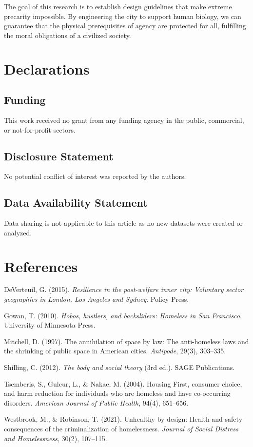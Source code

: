 \documentclass[12pt]{article}
\newenvironment{hangingpars}
  {\setlength{\parindent}{0pt}
   \setlength{\parskip}{6pt}
   \everypar{\hangindent=0.5in}}
  {}
\begin{document}
The goal of this research is to establish design guidelines that make extreme precarity impossible. By engineering the city to support human biology, we can guarantee that the physical prerequisites of agency are protected for all, fulfilling the moral obligations of a civilized society.

\section*{Declarations}

\subsection*{Funding}
This work received no grant from any funding agency in the public, commercial, or not-for-profit sectors.

\subsection*{Disclosure Statement}
No potential conflict of interest was reported by the authors.

\subsection*{Data Availability Statement}
Data sharing is not applicable to this article as no new datasets were created or analyzed.



\section*{References}
\begin{hangingpars}
DeVerteuil, G. (2015). \textit{Resilience in the post-welfare inner city: Voluntary sector geographies in London, Los Angeles and Sydney}. Policy Press.

Gowan, T. (2010). \textit{Hobos, hustlers, and backsliders: Homeless in San Francisco}. University of Minnesota Press.

Mitchell, D. (1997). The annihilation of space by law: The anti-homeless laws and the shrinking of public space in American cities. \textit{Antipode}, 29(3), 303–335.

Shilling, C. (2012). \textit{The body and social theory} (3rd ed.). SAGE Publications.

Tsemberis, S., Gulcur, L., \& Nakae, M. (2004). Housing First, consumer choice, and harm reduction for individuals who are homeless and have co-occurring disorders. \textit{American Journal of Public Health}, 94(4), 651–656.

Westbrook, M., \& Robinson, T. (2021). Unhealthy by design: Health and safety consequences of the criminalization of homelessness. \textit{Journal of Social Distress and Homelessness}, 30(2), 107–115.

\end{hangingpars}
\end{document}
